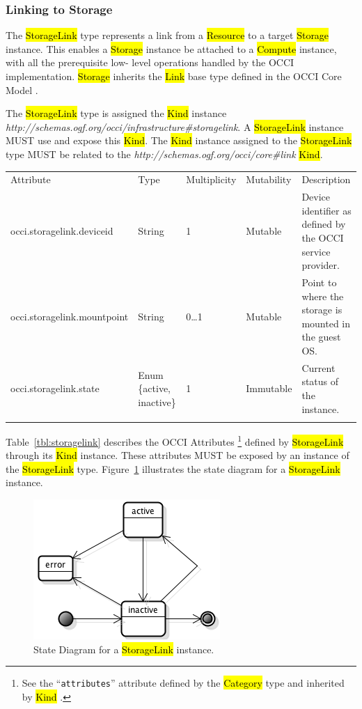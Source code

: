 \documentclass[10pt,a4paper]{article}
\begin{document}
\subsubsection{Linking to Storage}
The \hl{StorageLink} type represents a link from a \hl{Resource} to a
target \hl{Storage} instance. This enables a \hl{Storage} instance be
attached to a \hl{Compute} instance, with all the prerequisite low-
level operations handled by the OCCI implementation. \hl{Storage}
inherits the \hl{Link} base type defined in the OCCI Core Model
\cite{occi:core}.

The \hl{StorageLink} type is assigned the \hl{Kind} instance
\textit{http://schemas.ogf.org/occi/infrastructure\#storagelink}.  A
\hl{StorageLink} instance MUST use and expose this \hl{Kind}.  The
\hl{Kind} instance assigned to the \hl{StorageLink} type MUST be
related to the \textit{http://schemas.ogf.org/occi/core\#link}
\hl{Kind}.

{
	\begin{tabular}{lp{1.8cm}p{1cm}lp{5cm}}
	\toprule
	Attribute&Type&Multi\-plicity&Mutability&Description\\
	\colrule
	occi.storagelink.deviceid & String & 1 & Mutable 
	& Device identifier as defined by the OCCI service provider.\\
	occi.storagelink.mountpoint & String & 0\ldots1 & Mutable 
	& Point to where the storage is mounted in the guest OS.\\
	occi.storagelink.state & Enum \{active, inactive\}& 1 
	& Immutable & Current status of the instance.\\
	\botrule
	\end{tabular}
}

Table~\ref{tbl:storagelink} describes the OCCI Attributes%
\footnote{See the ``{\tt attributes}'' attribute defined by the
  \hl{Category} type and inherited by \hl{Kind} \cite{occi:core}.}
defined by \hl{StorageLink} through its \hl{Kind} instance. These
attributes MUST be exposed by an instance of the \hl{StorageLink}
type.  Figure~\ref{fig:storagelink_state} illustrates the state
diagram for a \hl{StorageLink} instance.

\begin{figure}[!h]
	\centering
	\includegraphics[scale=0.4]{figs/infra-link-state.png}
	\caption{State Diagram for a \hl{StorageLink} instance.}
	\label{fig:storagelink_state}
\end{figure}
\end{document}
